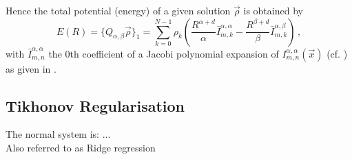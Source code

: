 
Hence the total potential (energy) of a given solution $\vec{\rho}$ is obtained by
\begin{equation}
  E(R) = \{Q_{\alpha,\beta} \vec{\rho}\}_1 = \sum_{k=0}^{N-1} \rho_k \left(\frac{R^{\alpha+d}}{\alpha} \bar{I}_{m,k}^{\alpha,\alpha} - \frac{R^{\beta+d}}{\beta} \bar{I}_{m,k}^{\alpha,\beta}\right)\,,
  \label{eq:total-energy-for-ansatz}
\end{equation}
with $\bar{I}_{m,n}^{\alpha,\alpha}$ the 0th coefficient of a Jacobi polynomial expansion of $I_{m,n}^{\alpha,\alpha}(\vec{x})$ (cf. ) as given in .

\subsection{Tikhonov Regularisation}
The normal system is: ... \\
Also referred to as Ridge regression
